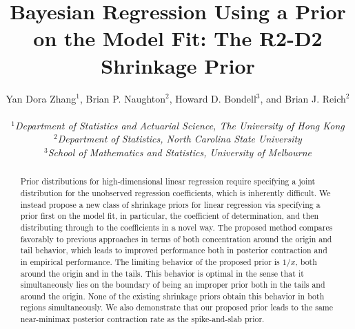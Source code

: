 \documentclass[12pt]{article}
\begin{document}
\def\spacingset#1{\renewcommand{\baselinestretch}%
{#1}\small\normalsize} \spacingset{1}



{
  \title{\bf Bayesian Regression Using a Prior on the Model Fit: The R2-D2 Shrinkage Prior}
  \author{{\normalsize Yan Dora Zhang$^{1}$, Brian P. Naughton$^2$, Howard D. Bondell$^{3}$, and Brian J. Reich$^2$}\\
  	    \\ {\normalsize $^1$\textit{Department of Statistics and Actuarial Science, The University of Hong Kong }} \\
     {\normalsize $^2$\textit{Department of Statistics, North Carolina State University} }\\
   {\normalsize  $^3$\textit{School of Mathematics and Statistics, University of Melbourne}}}
  \maketitle
}



\bigskip
\begin{abstract}
Prior distributions for high-dimensional linear regression require specifying a joint distribution for the unobserved regression coefficients, which is inherently difficult. We instead propose  a new  class of shrinkage priors for linear regression via specifying a prior first on the model fit, in particular, the coefficient of determination, and then distributing through to the coefficients in a novel way. The  proposed    method  compares favorably to  previous approaches in terms of both concentration around the origin and tail behavior, which leads to improved performance both in posterior contraction and in empirical performance.  The limiting behavior of the proposed prior is $1/x$, both around the origin and in the tails. This behavior is optimal in the sense that it simultaneously lies on the boundary of being an improper prior both in the tails and around the origin. None of the existing shrinkage priors obtain this behavior in both regions simultaneously. We also demonstrate  that  our proposed  prior  leads to the same near-minimax posterior contraction
rate as the  spike-and-slab prior.
\end{abstract}
\end{document}
